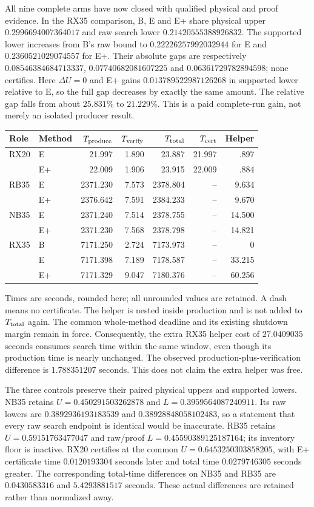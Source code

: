 All nine complete arms have now closed with qualified physical and proof
evidence. In the RX35 comparison, B, E and E+ share physical upper
$0.2996694007364017$ and raw search lower $0.21420555388926832$.
The supported lower increases from B's raw bound to
$0.22226257992032944$ for E and $0.2360521029074557$ for E+.
Their absolute gaps are respectively $0.08546384684713337$,
$0.07740682081607225$ and $0.06361729782894598$; none certifies.
Here $\Delta U=0$ and E+ gains $0.013789522987126268$ in supported
lower relative to E, so the full gap decreases by exactly the same amount.
The relative gap falls from about $25.831\%$ to $21.229\%$.
This is a paid complete-run gain, not merely an isolated producer result.

\begin{center}
\small
\begin{tabular}{llrrrrr}
Role & Method & $T_{\rm produce}$ & $T_{\rm verify}$ & $T_{\rm total}$ & $T_{\rm cert}$ & Helper\\
\hline
RX20 & E  &21.997&1.890&23.887&21.997&.897\\
     & E+ &22.009&1.906&23.915&22.009&.884\\
RB35 & E  &2371.230&7.573&2378.804&--&9.634\\
     & E+ &2376.642&7.591&2384.233&--&9.670\\
NB35 & E  &2371.240&7.514&2378.755&--&14.500\\
     & E+ &2371.230&7.568&2378.798&--&14.821\\
RX35 & B  &7171.250&2.724&7173.973&--&0\\
     & E  &7171.398&7.189&7178.587&--&33.215\\
     & E+ &7171.329&9.047&7180.376&--&60.256\\
\end{tabular}
\end{center}
Times are seconds, rounded here; all unrounded values are retained. A dash
means no certificate. The helper is nested inside production and is not
added to $T_{\rm total}$ again. The common whole-method deadline and its
existing shutdown margin remain in force. Consequently, the extra RX35
helper cost of $27.0409035$ seconds consumes search time within the same
window, even though its production time is nearly unchanged. The observed
production-plus-verification difference is $1.788351207$ seconds. This
does not claim the extra helper was free.

The three controls preserve their paired physical uppers and supported
lowers. NB35 retains $U=0.450291503262878$ and
$L=0.3959564087240911$. Its raw lowers are
$0.3892936193183539$ and $0.38928848058102483$, so a statement that every
raw search endpoint is identical would be inaccurate. RB35 retains
$U=0.59151763477047$ and raw/proof $L=0.45590389125187164$; its inventory
floor is inactive. RX20 certifies at the common $U=0.6453250303858205$,
with E+ certificate time $0.0120193304$ seconds later and total time
$0.0279746305$ seconds greater. The corresponding total-time differences
on NB35 and RB35 are $0.0430583316$ and $5.4293881517$ seconds. These
actual differences are retained rather than normalized away.

